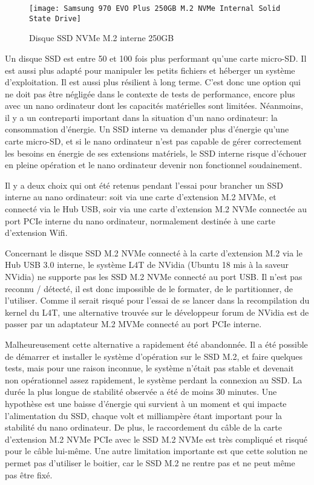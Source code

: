 \begin{figure}[H]
    \centering
    \texttt{[image: Samsung 970 EVO Plus 250GB M.2 NVMe Internal Solid State Drive]}
    \caption{Disque SSD NVMe M.2 interne 250GB}
    \label{fig:disquessd}
\end{figure}
\par Un disque SSD est entre 50 et 100 fois plus performant qu'une carte micro-SD. Il est aussi plus adapté pour manipuler les petits fichiers et héberger un système d'exploitation. Il est aussi plus résilient à long terme. C'est donc une option qui ne doit pas être négligée dans le contexte de tests de performance, encore plus avec un nano ordinateur dont les capacités matérielles sont limitées. Néanmoins, il y a un contreparti important dans la situation d'un nano ordinateur: la consommation d'énergie. Un SSD interne va demander plus d'énergie qu'une carte micro-SD, et si le nano ordinateur n'est pas capable de gérer correctement les besoins en énergie de ses extensions matériels, le SSD interne risque d'échouer en pleine opération et le nano ordinateur devenir non fonctionnel soudainement.
\par Il y a deux choix qui ont été retenus pendant l'essai pour brancher un SSD interne au nano ordinateur: soit via une carte d'extension M.2 MVMe, et connecté via le Hub USB, soir via une carte d'extension M.2 NVMe connectée au port PCIe interne du nano ordinateur, normalement destinée à une carte d'extension Wifi.
\par Concernant le disque SSD M.2 NVMe connecté à la carte d'extension M.2 via le Hub USB 3.0 interne, le système L4T de NVidia (Ubuntu 18 mis à la saveur NVidia) ne supporte pas les SSD M.2 NVMe connecté au port USB. Il n'est pas reconnu / détecté, il est donc impossible de le formater, de le partitionner, de l'utiliser. Comme il serait risqué pour l'essai de se lancer dans la recompilation du kernel du L4T, une alternative trouvée sur le développeur forum de NVidia est de passer par un adaptateur M.2 MVMe connecté au port PCIe interne.
\par Malheureusement cette alternative a rapidement été abandonnée. Il a été possible de démarrer et installer le système d'opération sur le SSD M.2, et faire quelques tests, mais pour une raison inconnue, le système n'était pas stable et devenait non opérationnel assez rapidement, le système perdant la connexion au SSD. La durée la plus longue de stabilité observée a été de moins 30 minutes. Une hypothèse est une baisse d'énergie qui survient à un moment et qui impacte l'alimentation du SSD, chaque volt et milliampère étant important pour la stabilité du nano ordinateur. De plus, le raccordement du câble de la carte d'extension M.2 NVMe PCIe avec le SSD M.2 NVMe est très compliqué et risqué pour le câble lui-même. Une autre limitation importante est que cette solution ne permet pas d'utiliser le boitier, car le SSD M.2 ne rentre pas et ne peut même pas être fixé. 
